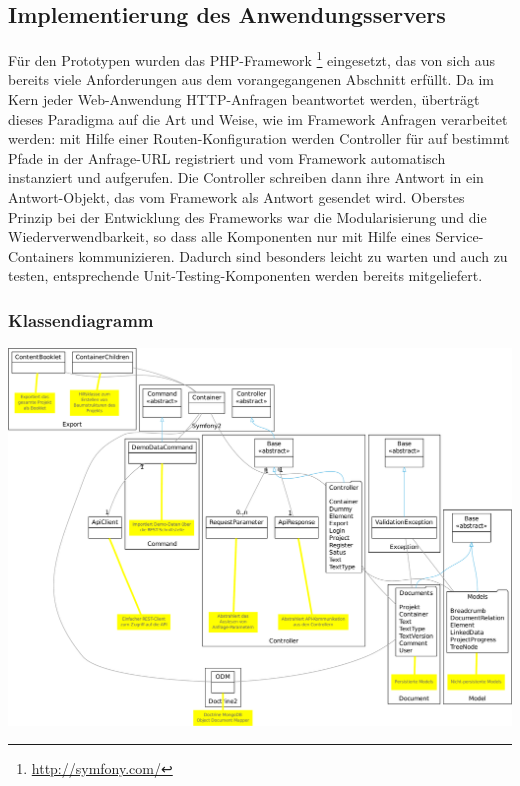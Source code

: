 \subsection{Implementierung des Anwendungsservers}

Für den Prototypen wurden das PHP-Framework \footnote{\url{http://symfony.com/}} eingesetzt, das von sich aus bereits viele Anforderungen aus dem vorangegangenen Abschnitt erfüllt. Da im Kern jeder Web-Anwendung HTTP-Anfragen beantwortet werden, überträgt  dieses Paradigma auf die Art und Weise, wie im Framework Anfragen verarbeitet werden: mit Hilfe einer Routen-Konfiguration werden Controller für auf bestimmt Pfade in der Anfrage-URL registriert und vom Framework automatisch instanziert und aufgerufen. Die Controller schreiben dann ihre Antwort in ein Antwort-Objekt, das vom Framework als Antwort gesendet wird. Oberstes Prinzip bei der Entwicklung des Frameworks war die Modularisierung und die Wiederverwendbarkeit, so dass alle Komponenten nur mit Hilfe eines Service-Containers kommunizieren. Dadurch sind  besonders leicht zu warten und auch zu testen, entsprechende Unit-Testing-Komponenten werden bereits mitgeliefert.

\subsubsection{Klassendiagramm}

\begin{center}
\includegraphics[width=\textwidth]{media/prototyp-klassendiagramm.pdf}
\end{center}
\label{chart:prototyp-klassendiagramm}

